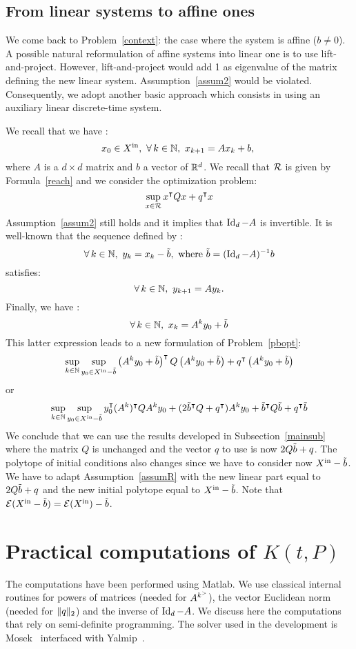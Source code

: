 \documentclass[10pt]{article}
\begin{document}
\subsection{From linear systems to affine ones}
\label{affine}
We come back to Problem~\eqref{context}: the case where the system is affine ($b\neq 0$).
A possible natural reformulation of affine systems into linear one is to use lift-and-project. However, lift-and-project would add 1 as eigenvalue of the matrix defining the new linear system. Assumption~\ref{assum2} would be violated.  Consequently, we adopt another basic approach which consists in using an auxiliary linear discrete-time system.   

 We recall that we have :
\[
x_0\in \xin,\ \forall\, k\in\nn,\ x_{k+1}=A x_k+b,\
\]
where $A$ is a $d\times d$ matrix and $b$ a vector of $\mathbb R^d$. We recall that $\mathcal{R}$ is given by Formula~\eqref{reach} and we consider the optimization problem:
\[
\sup_{x\in\mathcal{R}} x^\intercal Q x+q^\intercal x
\]
Assumption~\ref{assum2} still holds and it implies that $\operatorname{Id}_d-A$ is invertible. It is well-known that the sequence defined by :
\[
\forall\, k\in\mathbb{N},\ y_k=x_k-\tilde{b},\text{ where } \tilde{b}=(\operatorname{Id}_d-A)^{-1} b
\]
satisfies:
\[
\forall\, k\in\mathbb{N},\ y_{k+1}=A y_k. 
\]
Finally, we have :
\[
\forall\, k\in\nn,\ x_k=A^k y_0+\btilde
\]
This latter expression leads to a new formulation of Problem~\eqref{pbopt}: 
\[
\sup_{k\in\mathbb{N}} \sup_{y_0\in X^\mathrm{in}-\tilde{b}} \left(A^k y_0+\tilde{b}\right)^\intercal Q  \left(A^k y_0+\tilde{b}\right)+q^\intercal  \left(A^k y_0+\tilde{b}\right)
\]
or
\[
\sup_{k\in\mathbb{N}} \sup_{y_0\in X^\mathrm{in}-\tilde{b}} y_0^\intercal (A^k)^\intercal Q  A^k y_0+(2\tilde{b}^\intercal Q+q^\intercal) A^k y_0 +\tilde{b}^\intercal Q \tilde{b}+q^\intercal \tilde{b}
\]
We conclude that we can use the results developed in Subsection~\ref{mainsub} where the matrix $Q$ is unchanged and the vector $q$ to use is now $2Q\tilde{b}+q$. The polytope of initial conditions also changes since we have to consider now $X^\mathrm{in}-\tilde{b}$. We have to adapt Assumption~\ref{assumR} with the new linear part equal to $2Q\tilde{b}+q$ and the new initial polytope equal to $X^\mathrm{in}-\tilde{b}$. Note that $\mathcal{E}(X^\mathrm{in}-\tilde{b})=\mathcal{E}(X^\mathrm{in})-\tilde{b}$.

\section{Practical computations of $K(t,P)$}
\label{computations}
The computations have been performed using Matlab. We use classical internal routines for powers of matrices (needed for $A^{k^{>}}$), the vector Euclidean norm (needed for $\| q\|_2$) and the inverse of $\operatorname{Id}_d-A$. We discuss here the computations that rely on semi-definite programming. The solver used in the development is Mosek~\cite{andersen2000mosek} interfaced with Yalmip~\cite{Lofberg2004}. 
\end{document}

